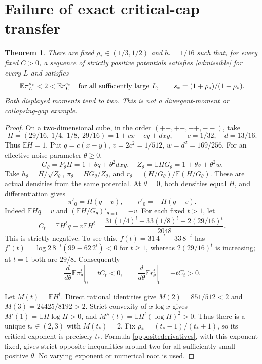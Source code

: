 \documentclass[11pt]{article}
\newcommand{\E}{\mathbb E}
\newtheorem{theorem}{Theorem}[section]
\begin{document}
\section{Failure of exact critical-cap transfer}
\begin{theorem}\label{capfailure}
There are fixed $\rho_*\in(1/3,1/2)$ and $b_*=1/16$ such that, for every fixed $C>0$, a sequence of strictly positive potentials satisfies \eqref{admissible} for every $L$ and satisfies
\[
 \E\pi_L^{s_*}<2<\E r_L^{s_*}
 \quad\hbox{for all sufficiently large }L,
 \qquad s_*=(1+\rho_*)/(1-\rho_*).
\]
Both displayed moments tend to two. This is not a divergent-moment or collapsing-gap example.
\end{theorem}
\begin{proof}
On a two-dimensional cube, in the order $(++,+-,-+,--)$, take
\[
 H=(29/16,\ 1/4,\ 1/8,\ 29/16)
   =1+cx-cy+dxy,\qquad c=1/32,\quad d=13/16.
\]
Thus $\E H=1$. Put $q=c(x-y)$, $v=2c^2=1/512$, $w=d^2=169/256$. For an effective noise parameter $\theta\geq0$,
\[
 G_\theta=P_\theta H=1+\theta q+\theta^2dxy,
 \quad Z_\theta=\E HG_\theta=1+\theta v+\theta^2w.
\]
Take $h_\theta=H/\sqrt{Z_\theta}$, $\pi_\theta=HG_\theta/Z_\theta$, and
$r_\theta=(H/G_\theta)/\E(H/G_\theta)$. These are actual densities from the same potential. At $\theta=0$, both densities equal $H$, and differentiation gives
\[
 \pi'_0=H(q-v),\qquad r'_0=-H(q-v).
\]
Indeed $\E Hq=v$ and $(\E H/G_\theta)'_{\theta=0}=-v$. For each fixed $t>1$, let
\[
 C_t=\E H^tq-v\E H^t
 =\frac{31(1/4)^t-33(1/8)^t-2(29/16)^t}{2048}.
\]
This is strictly negative. To see this, $f(t)=31\,4^{-t}-33\,8^{-t}$ has
$f'(t)=\log2\,8^{-t}(99-62\,2^t)<0$ for $t\geq1$, whereas $2(29/16)^t$ is increasing; at $t=1$ both are $29/8$. Consequently
\begin{equation}\label{oppositederivatives}
 \left.\frac{d}{d\theta}\E\pi_\theta^t\right|_0=tC_t<0,
 \qquad
 \left.\frac{d}{d\theta}\E r_\theta^t\right|_0=-tC_t>0.
\end{equation}

Let $M(t)=\E H^t$. Direct rational identities give
$M(2)=851/512<2$ and $M(3)=24425/8192>2$.
Strict convexity of $x\log x$ gives $M'(1)=\E H\log H>0$, and
$M''(t)=\E H^t(\log H)^2>0$. Thus there is a unique $t_*\in(2,3)$ with $M(t_*)=2$. Fix $\rho_*=(t_*-1)/(t_*+1)$, so its critical exponent is precisely $t_*$. Formula \eqref{oppositederivatives}, with this exponent fixed, gives strict opposite inequalities around two for all sufficiently small positive $\theta$. No varying exponent or numerical root is used.


\end{proof}
\end{document}
